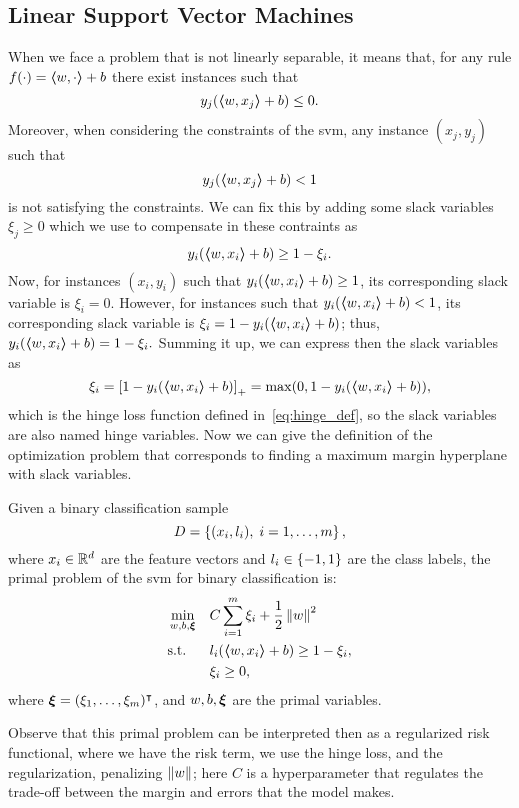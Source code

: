 \subsection{Linear Support Vector Machines}
%
When we face a problem that is not linearly separable, it means that, for any rule $f(\cdot) = \bm{\left\langle} w, \cdot \bm{\right\rangle} + b$ there exist instances such that 
$$ y_j (\bm{\left\langle} w, x_j \bm{\right\rangle} + b) \leq 0 .$$
Moreover, when considering the constraints of the \acrshort{svm}, any instance $(x_j, y_j)$ such that 
$$ y_j (\bm{\left\langle} w, x_j \bm{\right\rangle} + b) < 1 $$
is not satisfying the constraints.
%
We can fix this by adding some slack variables $\xi_j \geq 0$ which we use to compensate in these contraints as
$$ y_i (\bm{\left\langle} w, x_i \bm{\right\rangle} + b) \geq 1 - \xi_i. $$
Now, for instances $(x_i, y_i)$ such that $y_i (\bm{\left\langle} w, x_i \bm{\right\rangle} + b) \geq 1$, its corresponding slack variable is $\xi_i = 0$. However, for instances such that $y_i (\bm{\left\langle} w, x_i \bm{\right\rangle} + b) < 1$, its corresponding slack variable is $\xi_i = 1 - y_i (\bm{\left\langle} w, x_i \bm{\right\rangle} + b)$; thus, $y_i (\bm{\left\langle} w, x_i \bm{\right\rangle} + b) = 1 - \xi_i .$
Summing it up, we can express then the slack variables as 
\begin{equation}
    \nonumber
    \xi_i = \left[1 - y_i (\bm{\left\langle} w, x_i \bm{\right\rangle} + b)\right]_{+} = \max(0, 1 - y_i (\bm{\left\langle} w, x_i \bm{\right\rangle} + b)),
\end{equation} 
which is the hinge loss function defined in~\eqref{eq:hinge_def}, so the slack variables are also named hinge variables. 
Now we can give the definition of the optimization problem that corresponds to finding a maximum margin hyperplane with slack variables.
\begin{definition}
    Given a binary classification sample
    $$ D = \left\{(x_i, l_i), \; i=1, \ldots, m\right\} ,$$
    where $x_i \in \mathbb{R}^d$ are the feature vectors and $l_i \in \left\{-1, 1\right\}$ are the class labels, 
    the primal problem of the \acrshort{svm} for binary classification is:
    \begin{equation}
        \label{eq:linear_primal_clas}
        \begin{aligned}
            &\min_{w, b, \fv{\xi}} & & C \sum_{i=1}^m \xi_i + \frac{1}{2} \norm{w}^2 \\
            & \text{s.t.} & & l_i (\dotp{w}{x_i} + b) \geq 1 - \xi_i , \\
            & & & \xi_i \geq 0 ,      
        \end{aligned}  
    \end{equation}
    where $\bm{\xi} = (\xi_1, \ldots, \xi_m)^\intercal$, and $w, b, \bm{\xi}$ are the primal variables.
\end{definition}
Observe that this primal problem can be interpreted then as a regularized risk functional, where we have the risk term, we use the hinge loss, and the regularization, penalizing $\left\lVert w\right\rVert$; here $C$ is a hyperparameter that regulates the trade-off between the margin and errors that the model makes.

